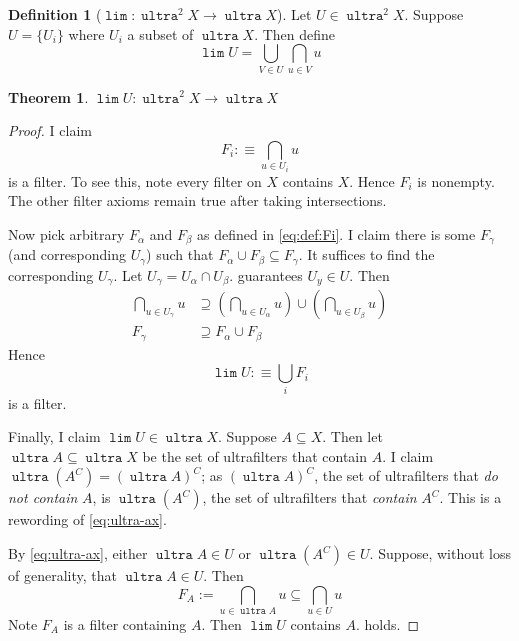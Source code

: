 \documentclass[10pt]{scrartcl}
\newcounter{thms}
\numberwithin{thms}{section}
\theoremstyle{definition}
\newtheorem{defn}[thms]{Definition}
\newtheorem{theorem}[thms]{Theorem}
\newcommand{\define}{:\equiv}
\renewcommand{\lim}{\operatorname{\mathtt{lim}}}
\newcommand{\ultra}{\operatorname{\mathtt{ultra}}}
\begin{document}
\begin{defn}[$\lim: \ultra^2 X \to \ultra X$]
  Let $U\in \ultra^2 X$. Suppose $U=\{U_i\}$ where $U_i$ a subset of $\ultra X$. 
  Then define  
  \begin{equation}
    \lim U = \bigcup_{V\in U}\bigcap_{u\in V} u
    \label{eq:def:lim}
  \end{equation}
\end{defn}

\begin{theorem}
  $\lim U:\ultra^2 X \to \ultra X$
\end{theorem}

\begin{proof}
  I claim 
  \begin{equation}
    \label{eq:def:Fi}
    F_i\define\bigcap_{u \in U_i} u
  \end{equation}
  is a filter. To see this, note every filter on $X$ contains $X$. Hence $F_i$ is nonempty. The other filter axioms remain true after taking intersections. 
  
  Now pick arbitrary $F_\alpha$ and $F_\beta$ as defined in \cref{eq:def:Fi}. I claim there is some $F_\gamma$ (and corresponding $U_\gamma$) such that $F_\alpha \cup F_\beta\subseteq F_\gamma$. It suffices to find the corresponding $U_\gamma$. Let $U_\gamma=U_\alpha\cap U_\beta$.  guarantees $U_y\in U$. Then 
  \begin{align*}
  \bigcap_{u\in U_\gamma} u &\supseteq \left(\bigcap_{u\in U_\alpha} u\right) \cup \left(\bigcap_{u\in U_\beta}u\right)\\
    F_\gamma &\supseteq F_\alpha \cup F_\beta
  \end{align*}
  Hence
  \[
  \lim U \define\bigcup_{i} F_i 
  \]
  is a filter. 
  
  Finally, I claim $\lim U\in \ultra X$. Suppose $A\subseteq X$. Then let $\ultra A\subseteq \ultra X$ be the set of ultrafilters that contain $A$. I claim $\ultra (A^C) =(\ultra A)^C$; as $(\ultra A)^C$, the set of ultrafilters that \emph{do not contain} $A$, is $\ultra(A^C)$, the set of ultrafilters that  
\emph{contain} $A^C$. This is a rewording of \cref{eq:ultra-ax}.

By \cref{eq:ultra-ax}, either $\ultra A\in U$ or $\ultra (A^C)\in U$. Suppose, without loss of generality, that $\ultra A\in U$. Then
\[
F_A:=\bigcap _{u \in \ultra A} u \subseteq \bigcap_ {u\in U} u 
\]
Note $F_A$ is a filter containing $A$. Then $\lim U$ contains $A$.  holds. 
\end{proof}
\end{document}
